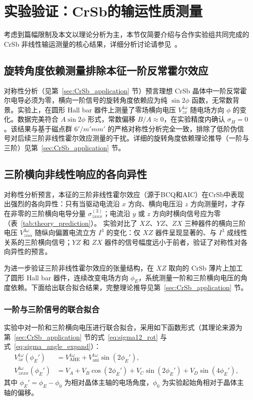 \chapter{实验验证：CrSb的输运性质测量}

考虑到篇幅限制及本文以理论分析为主，本节仅简要介绍与合作实验组共同完成的 CrSb 非线性输运测量的核心结果，详细分析讨论请参见~\cite{sankar_broadband_2025}。

\section{旋转角度依赖测量排除本征一阶反常霍尔效应}

对称性分析（见第~\ref{sec:CrSb_application} 节）预言理想 CrSb 晶体中一阶反常霍尔电导必须为零，横向一阶信号的旋转角度依赖应为纯 $\sin 2\phi$ 函数，无常数背景。实验上，在圆形 Hall bar 器件上测量了零场横向电压 $V_{zx}^{1\omega}$ 随电场方向 $\phi$ 的变化。数据完美符合 $A\sin 2\phi$ 形式，常数偏移 $B/A\approx 0$，在实验精度内确认 $\sigma_H=0$。该结果与基于磁点群 $6'/m'mm'$ 的严格对称性分析完全一致，排除了低阶伪信号对后续三阶非线性霍尔效应测量的干扰。详细的旋转角度依赖理论推导（一阶与三阶）见第~\ref{sec:CrSb_application} 节。

\section{三阶横向非线性响应的各向异性}

对称性分析预言，本征的三阶非线性霍尔效应（源于BCQ和AIC）在CrSb中表现出强烈的各向异性：只有当驱动电流沿 $x$ 方向、横向电压沿 $z$ 方向测量时，才存在非零的三阶横向电导分量 $\sigma_{zxxx}^{(3)}$；电流沿 $y$ 或 $z$ 方向时横向信号应为零（表~\ref{tab:theory_prediction}）。
实验对比了 $XZ$、$YZ$、$ZX$ 三种器件的横向三阶电压 $V_{z\alpha\alpha}^{3\omega}$ 随纵向偏置电流立方 $I^3$ 的变化：仅 $XZ$ 器件呈现显著的、与 $I^3$ 成线性关系的三阶横向信号；$YZ$ 和 $ZX$ 器件的信号幅度远小于前者，验证了对称性对各向异性的预言。

为进一步验证三阶非线性霍尔效应的张量结构，在 $XZ$ 取向的 CrSb 薄片上加工了圆形 Hall bar 器件，连续改变电场方向 $\phi_E$，系统测量一阶和三阶横向电压的角度依赖。下面给出联合拟合结果，完整理论推导见第~\ref{sec:CrSb_application} 节。

\subsection{一阶与三阶信号的联合拟合}

实验中对一阶和三阶横向电压进行联合拟合，采用如下函数形式（其理论来源为第~\ref{sec:CrSb_application} 节的式~\eqref{eq:sigma12_rot} 与式~\eqref{eq:sigma_angle_expand}）：
\begin{align}
  V_{zx}^{1\omega}(\phi_E') &= V_{\mathrm{AHE}}^{1\omega} + V_{\mathrm{ani}}^{1\omega} \sin(2\phi_E'), \label{eq:fit1}\\
  V_{zxxx}^{3\omega}(\phi_E') &= V_A + V_B\cos(2\phi_E') + V_C\sin(2\phi_E') + V_D\sin(4\phi_E'), \label{eq:fit3}
\end{align}
其中 $\phi_E' = \phi_E - \phi_0$ 为相对晶体主轴的电场角度，$\phi_0$ 为实验起始角相对于晶体主轴的偏移。

